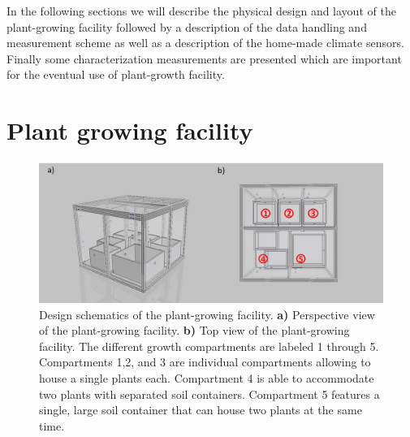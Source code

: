 \documentclass[reprint,superscriptaddress,aps,amsmath,amssymb]{revtex4-1}
\begin{document}
In the following sections we will describe the physical design and layout of the plant-growing facility followed by a description of the data handling and measurement scheme as well as a description of the home-made climate sensors. Finally some characterization measurements are presented which are important for the eventual use of plant-growth facility.

\section{Plant growing facility}
\begin{figure}
    \centering
    \includegraphics[width=1\linewidth]{growbox.jpg}
    \caption{Design schematics of the plant-growing facility. \textbf{a)} Perspective view of the plant-growing facility. \textbf{b)} Top view of the plant-growing facility. The different growth compartments are labeled 1 through 5. Compartments 1,2, and 3 are individual compartments allowing to house a single plants each. Compartment 4 is able to accommodate two plants with separated soil containers. Compartment 5 features a single, large soil container that can house two plants at the same time.}
    \label{fig: Growth Box}
\end{figure}
\end{document}
